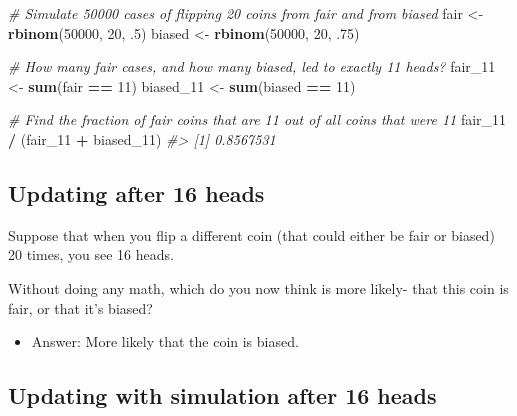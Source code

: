 \documentclass[]{article}
\newenvironment{Shaded}{\begin{snugshade}}{\end{snugshade}}
\newcommand{\CommentTok}[1]{\textcolor[rgb]{0.56,0.35,0.01}{\textit{#1}}}
\newcommand{\DecValTok}[1]{\textcolor[rgb]{0.00,0.00,0.81}{#1}}
\newcommand{\FloatTok}[1]{\textcolor[rgb]{0.00,0.00,0.81}{#1}}
\newcommand{\KeywordTok}[1]{\textcolor[rgb]{0.13,0.29,0.53}{\textbf{#1}}}
\newcommand{\NormalTok}[1]{#1}
\newcommand{\OperatorTok}[1]{\textcolor[rgb]{0.81,0.36,0.00}{\textbf{#1}}}
\newcommand{\StringTok}[1]{\textcolor[rgb]{0.31,0.60,0.02}{#1}}
\providecommand{\tightlist}{%
  \setlength{\itemsep}{0pt}\setlength{\parskip}{0pt}}
\begin{document}
\begin{Shaded}
\begin{Highlighting}[]
\CommentTok{# Simulate 50000 cases of flipping 20 coins from fair and from biased}
\NormalTok{fair <-}\StringTok{ }\KeywordTok{rbinom}\NormalTok{(}\DecValTok{50000}\NormalTok{, }\DecValTok{20}\NormalTok{, }\FloatTok{.5}\NormalTok{)}
\NormalTok{biased <-}\StringTok{ }\KeywordTok{rbinom}\NormalTok{(}\DecValTok{50000}\NormalTok{, }\DecValTok{20}\NormalTok{, }\FloatTok{.75}\NormalTok{)}

\CommentTok{# How many fair cases, and how many biased, led to exactly 11 heads?}
\NormalTok{fair_}\DecValTok{11}\NormalTok{ <-}\StringTok{ }\KeywordTok{sum}\NormalTok{(fair }\OperatorTok{==}\StringTok{ }\DecValTok{11}\NormalTok{)}
\NormalTok{biased_}\DecValTok{11}\NormalTok{ <-}\StringTok{ }\KeywordTok{sum}\NormalTok{(biased }\OperatorTok{==}\StringTok{ }\DecValTok{11}\NormalTok{)}

\CommentTok{# Find the fraction of fair coins that are 11 out of all coins that were 11}
\NormalTok{fair_}\DecValTok{11} \OperatorTok{/}\StringTok{ }\NormalTok{(fair_}\DecValTok{11} \OperatorTok{+}\StringTok{ }\NormalTok{biased_}\DecValTok{11}\NormalTok{)}
\CommentTok{#> [1] 0.8567531}
\end{Highlighting}
\end{Shaded}

\hypertarget{updating-after-16-heads}{%
\subsection{Updating after 16 heads}\label{updating-after-16-heads}}

Suppose that when you flip a different coin (that could either be fair
or biased) 20 times, you see 16 heads.

Without doing any math, which do you now think is more likely- that this
coin is fair, or that it's biased?

\begin{itemize}
\tightlist
\item
  Answer: More likely that the coin is biased.
\end{itemize}

\hypertarget{updating-with-simulation-after-16-heads}{%
\subsection{Updating with simulation after 16
heads}\label{updating-with-simulation-after-16-heads}}
\end{document}
